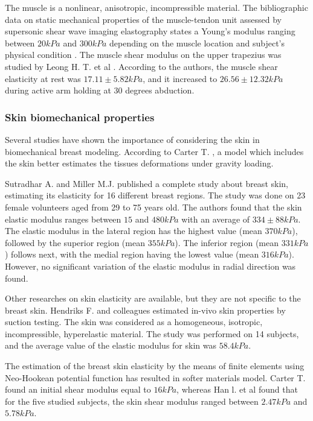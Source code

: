 The muscle is a nonlinear, anisotropic, incompressible material.  The bibliographic data on static mechanical properties of the muscle-tendon unit assessed by supersonic shear wave imaging elastography states a Young's modulus ranging between $20kPa$ and $300kPa$ depending on the muscle location and subject's physical condition \citep{lima_eassessment_2018}.  The muscle shear modulus on the upper trapezius was studied by Leong H. T. et al \citep{leong_quantitative_2013}. According to the authors, the muscle shear elasticity at rest was $17.11\pm 5.82 kPa$, and it increased to $26.56\pm 12.32 kPa$ during active arm holding at 30 degrees abduction. 

\subsubsection*{Skin biomechanical properties}
Several studies have shown the importance of considering the skin in biomechanical breast modeling. According to Carter T. \citep{carter_biomechanical_2009}, a model which includes the skin better estimates the tissues deformations under gravity loading.

Sutradhar A. and Miller M.J. \citep{sutradhar_vivo_2013} published a complete study about breast skin, estimating its elasticity for 16 different breast regions. The study was done on 23 female volunteers aged from 29 to 75 years old. The authors found that the skin elastic modulus ranges between $15$ and $480 kPa$ with an average of $334\pm 88 kPa$. The elastic modulus in the lateral region has the highest value (mean $370 kPa$), followed by the superior region (mean $355 kPa$). The inferior region (mean $331 kPa$) follows next, with the medial region having the
lowest value (mean $316 kPa$). However, no significant variation of the elastic modulus in radial direction was found. 
 
Other researches on skin elasticity are available, but they are not specific to the breast skin. Hendriks F. and colleagues \citep{hendriks_relative_2006} estimated in-vivo skin properties by suction testing. The skin was considered as a homogeneous, isotropic, incompressible, hyperelastic material. The study was performed on 14 subjects, and the average value of the elastic modulus for skin was $58.4 kPa$.

The estimation of the breast skin elasticity by the means of finite elements using Neo-Hookean potential function has resulted in softer materials model. Carter T.\citep{carter_determining_2009} found an initial shear modulus equal to $16kPa$, whereas Han l. et al \citep{han_nonlinear_2014} found that for the five studied subjects, the skin shear modulus ranged between $2.47 kPa$ and $5.78kPa$. 


